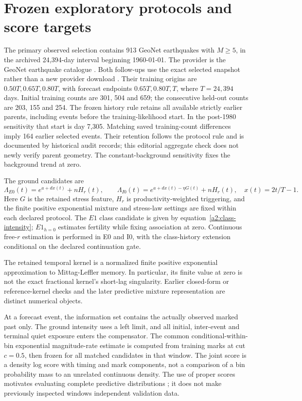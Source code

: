 \section{Frozen exploratory protocols and score targets}
\label{a2:protocol}

The primary observed selection contains 913 GeoNet earthquakes with
\(M\geq5\), in the archived 24,394-day interval beginning 1960-01-01.
The provider is the GeoNet earthquake catalogue \citep{GeoNetCatalogue}.
Both follow-ups use the exact selected snapshot rather than a new provider
download \citep{MagnitudePredictionPilot2026,ProductivitySlopePilot2026}.
Their training origins are \(0.50T,0.65T,0.80T\), with forecast endpoints
\(0.65T,0.80T,T\), where \(T=24{,}394\) days. Initial training counts are
301, 504 and 659; the consecutive held-out counts are 203, 155 and 254.
The frozen history rule retains all available strictly earlier parents,
including events before the training-likelihood start. In the post-1980
sensitivity that start is day 7,305. Matching saved training-count
differences imply 164 earlier selected events. Their retention follows
the protocol rule and is documented by historical audit records; this
editorial aggregate check does not newly verify parent geometry. The
constant-background sensitivity fixes the background trend at zero.

The ground candidates are
\[
 \Lambda_{E0}(t)=e^{a+d x(t)}+nH_r(t),\qquad
 \Lambda_{I0}(t)=e^{a+d x(t)-\eta G(t)}+nH_r(t),
 \quad x(t)=2t/T-1.
\]
Here \(G\) is the retained stress feature, \(H_r\) is productivity-weighted
triggering, and the finite positive exponential mixture and stress-law
settings are fixed within each declared protocol. The \(E1\) class
candidate is given by equation~\eqref{a2:class-intensity};
\(E1_{h=0}\) estimates fertility while fixing association at zero.
Continuous free-\(r\) estimation is performed in E0 and I0, with the
class-history extension conditional on the declared continuation gate.

The retained temporal kernel is a normalized finite positive exponential
approximation to Mittag-Leffler memory. In particular, its finite value
at zero is not the exact fractional kernel's short-lag singularity.
Earlier closed-form or reference-kernel checks and the later predictive
mixture representation are distinct numerical objects.

At a forecast event, the information set contains the actually observed
marked past only. The ground intensity uses a left limit, and all
initial, inter-event and terminal quiet exposure enters the compensator.
The common conditional-within-bin exponential magnitude-rate estimate is
computed from training marks at cut \(c=0.5\), then frozen for all matched
candidates in that window. The joint score is a density log score with
timing and mark components, not a comparison of a bin probability mass to
an unrelated continuous density. The use of proper scores motivates
evaluating complete predictive distributions \citep{GneitingRaftery2007};
it does not make previously inspected windows independent validation data.

